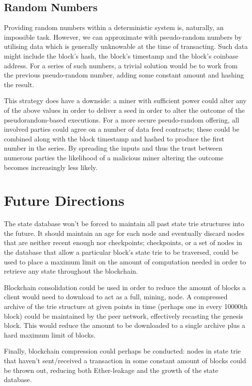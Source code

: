 \documentclass[9pt,oneside]{amsart}
\begin{document}
\begin{multicols}{2}
\subsection{Random Numbers}
Providing random numbers within a deterministic system is, naturally, an impossible task. However, we can approximate with pseudo-random numbers by utilising data which is generally unknowable at the time of transacting. Such data might include the block's hash, the block's timestamp and the block's coinbase address. For a series of such numbers, a trivial solution would be to work from the previous pseudo-random number, adding some constant amount and hashing the result.

This strategy does have a downside: a miner with sufficient power could alter any of the above values in order to deliver a seed in order to alter the outcome of the pseudorandom-based executions. For a more secure pseudo-random offering, all involved parties could agree on a number of data feed contracts; these could be combined along with the block timestamp and hashed to produce the first number in the series. By spreading the inputs and thus the trust between numerous parties the likelihood of a malicious miner altering the outcome becomes increasingly less likely.

\section{Future Directions} \label{ch:future}

The state database won't be forced to maintain all past state trie structures into the future. It should maintain an age for each node and eventually discard nodes that are neither recent enough nor checkpoints; checkpoints, or a set of nodes in the database that allow a particular block's state trie to be traversed, could be used to place a maximum limit on the amount of computation needed in order to retrieve any state throughout the blockchain.

Blockchain consolidation could be used in order to reduce the amount of blocks a client would need to download to act as a full, mining, node. A compressed archive of the trie structure at given points in time (perhaps one in every 10000th block) could be maintained by the peer network, effectively recasting the genesis block. This would reduce the amount to be downloaded to a single archive plus a hard maximum limit  of blocks.

Finally, blockchain compression could perhaps be conducted: nodes in state trie that haven't sent/received a transaction in some constant amount of blocks could be thrown out, reducing both Ether-leakage and the growth of the state database.


\end{multicols}
\end{document}
